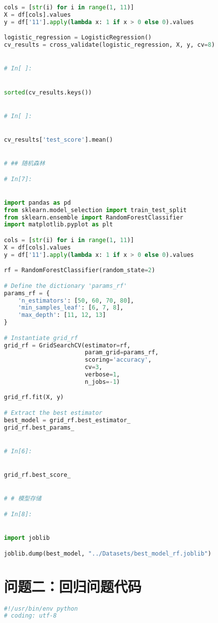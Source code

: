 \documentclass[withoutpreface,bwprint]{cumcmthesis}
\begin{document}
\begin{appendices}
\begin{lstlisting}[language=Python]
cols = [str(i) for i in range(1, 11)]
X = df[cols].values
y = df['11'].apply(lambda x: 1 if x > 0 else 0).values

logistic_regression = LogisticRegression()
cv_results = cross_validate(logistic_regression, X, y, cv=8)


# In[ ]:


sorted(cv_results.keys())


# In[ ]:


cv_results['test_score'].mean()


# ## 随机森林

# In[7]:


import pandas as pd
from sklearn.model_selection import train_test_split
from sklearn.ensemble import RandomForestClassifier
import matplotlib.pyplot as plt

cols = [str(i) for i in range(1, 11)]
X = df[cols].values
y = df['11'].apply(lambda x: 1 if x > 0 else 0).values

rf = RandomForestClassifier(random_state=2)

# Define the dictionary 'params_rf'
params_rf = {
    'n_estimators': [50, 60, 70, 80],
    'min_samples_leaf': [6, 7, 8],
    'max_depth': [11, 12, 13]
}

# Instantiate grid_rf
grid_rf = GridSearchCV(estimator=rf,
                       param_grid=params_rf,
                       scoring='accuracy',
                       cv=3,
                       verbose=1,
                       n_jobs=-1)

grid_rf.fit(X, y)

# Extract the best estimator
best_model = grid_rf.best_estimator_
grid_rf.best_params_


# In[6]:


grid_rf.best_score_


# # 模型存储

# In[8]:


import joblib

joblib.dump(best_model, "../Datasets/best_model_rf.joblib")

    \end{lstlisting}

    \section{问题二：回归问题代码}

    \begin{lstlisting}[language=Python]
#!/usr/bin/env python
# coding: utf-8


\end{lstlisting}
\end{appendices}
\end{document}

